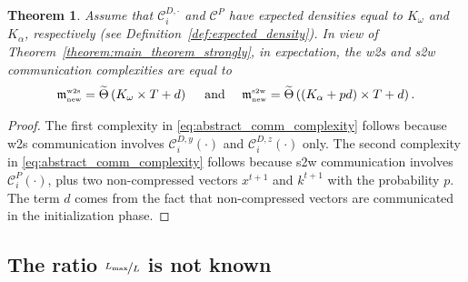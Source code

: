 \documentclass{article} %
\newcommand{\cC}{\mathcal{C}}
\theoremstyle{plain}
\newtheorem{theorem}{Theorem}[section]
\theoremstyle{definition}
\theoremstyle{remark}
\begin{document}
\begin{theorem}
  \label{theorem:comm_complexity}
  Assume that $\cC_i^{D, \cdot}$ and $\cC^{P}$ have expected densities equal to $K_{\omega}$ and $K_{\alpha}$, respectively (see Definition~\ref{def:expected_density}). In view of Theorem~\ref{theorem:main_theorem_strongly}, in expectation, the w2s and s2w communication complexities are equal to \begin{align}
    \label{eq:abstract_comm_complexity}
    \mathfrak{m}^{{\scriptscriptstyle \textnormal{w2s}}}_{{\scriptscriptstyle \textnormal{new}}} = \widetilde{\Theta}\left(K_{\omega} \times T + d\right) \quad\textnormal{ and } \quad \mathfrak{m}^{{\scriptscriptstyle \textnormal{s2w}}}_{{\scriptscriptstyle \textnormal{new}}} = \widetilde{\Theta}\left(\left(K_{\alpha} + p d\right) \times T + d\right).
  \end{align}
\end{theorem}
\begin{proof}
  The first complexity in \eqref{eq:abstract_comm_complexity} follows because w2s communication involves $\cC_i^{D, y}(\cdot)$ and $\cC_i^{D, z}(\cdot)$ only. The second complexity in \eqref{eq:abstract_comm_complexity} follows because s2w communication involves $\cC_i^{P}(\cdot)$, plus two non-compressed vectors $x^{t+1}$ and $k^{t+1}$ with the probability $p.$ The term $d$ comes from the fact that non-compressed vectors are communicated in the initialization phase.
\end{proof}

\subsection{The ratio $\nicefrac{L_{\max}}{L}$ is not known}
\end{document}
